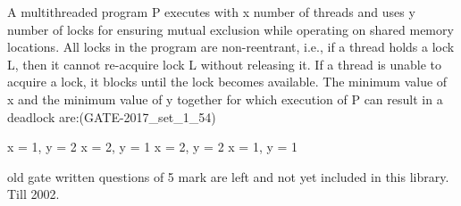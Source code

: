 
\begin{questyle}

  \question  A multithreaded program P executes with x number of threads and uses y number of locks for ensuring
            mutual exclusion while operating on shared memory locations. All locks in the program are
            non-reentrant, i.e., if a thread holds a lock L, then it cannot re-acquire lock L without
            releasing it. If a thread is unable to acquire a lock, it blocks until the lock becomes available.
            The minimum value of x and the minimum value of y together for which execution of P can result
            in a deadlock are:(GATE-2017\_set\_1\_54)

  \begin{choices}
    \choice x = 1, y = 2
    \choice x = 2, y = 1
    \choice x = 2, y = 2
    \choice x = 1, y = 1
  \end{choices}

  \end{questyle}




old gate written questions of 5 mark  are left and not yet included in this library. Till 2002.




